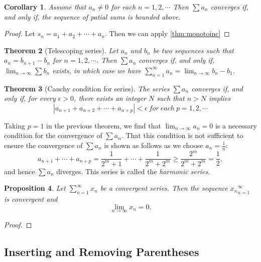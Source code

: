 \documentclass{article}
\newtheorem{theorem}{Theorem}[section]
\newtheorem{corollary}[theorem]{Corollary}
\newtheorem{prop}[theorem]{Proposition}
\theoremstyle{definition}
\begin{document}
\begin{corollary}
    Assume that $a_{n}\neq 0$ for each $n=1,2,\cdots$ Then $\sum a_{n}$
    converges if, and only if, the sequence of patial sums is bounded above.
\end{corollary}
\begin{proof}
    Let $s_{n}=a_{1}+a_{2}+\cdots+a_{n}$. Then we can apply \ref{thm:monotoinc}
\end{proof}

\begin{theorem}[Telescoping series]
    Let ${a_{n}}$ and ${b_{n}}$ be two sequences 
    such that $a_{n}=b_{n+1}-b_{n}$ for $n=1,2,\cdots$.
    Then $\sum a_{n}$ converges if, and only if, 
    $\lim_{n\rightarrow \infty}\sum b_{n}$ exists, in which 
    case we have $\sum_{n=1}^{\infty} a_{n}=\lim_{n\rightarrow \infty}b_{n}-b_{1}$.
\end{theorem}

\begin{theorem}[Cauchy condition for series]
    The series $\sum a_{n}$ converges if, and only if,
    for every $\epsilon>0$, there exists an integer $N$ such that
    $n>N$ implies 
    $$|a_{n+1}+a_{n+2}+\cdots+a_{n+p}|<\epsilon\ for\ each\ p=1,2,\cdots$$
\end{theorem}

Taking $p=1$ in the previous theorem, we find that $\lim_{n\rightarrow \infty}a_{n}=0$ is 
a necessary condition for the convergence of $\sum a_{n}$. That this condition is not sufficient
to ensure the convergence of $\sum a_{n}$ is shown as follows as we choose $a_{n}=\frac{1}{n}$:
$$a_{n+1}+\cdots+a_{n+p}=\frac{1}{2^{m}+1}+\cdots+\frac{1}{2^{m}+2^{m}}\geq\frac{2^{m}}{2^{m}+2^{m}}=\frac{1}{2},$$
and hence $\sum a_{n}$ diverges. This series is called the \textit{harmonic series}.

\begin{prop}
    Let $\sum_{n=1}^{\infty}x_{n}$ be a convergent series. Then the sequence 
    ${x_{n}}_{n=1}^{\infty}$ is convergent and $$\lim_{n\rightarrow \infty}x_{n} = 0.$$
\end{prop}

\begin{proof}
    
\end{proof}




\subsection{Inserting and Removing Parentheses}
\end{document}
